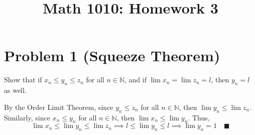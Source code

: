 \documentclass[10pt]{article}
\title{Math 1010: Homework 3}
\author{}
\date{}
\newcommand{\qed}{\quad \blacksquare}
\newcommand{\N}{\mathbb{N}}
\begin{document}
\maketitle
\vspace*{-0.5in}


\section*{Problem 1 (Squeeze Theorem)}
Show that if $x_n\leq y_n\leq z_n$ for all $n\in\mathbb{N}$, and if $\lim x_n=\lim z_n=l$, then $y_n=l$ as well.

    \color{blue}
        By the Order Limit Theorem, since $y_n \leq z_n$ for all $n \in \N$, then $\lim y_n \leq \lim z_n$. Similarly, since $x_n \leq y_n$ for all $n \in \N$, then $\lim x_n \leq \lim y_n$. Thus, \[\lim x_n \leq \lim y_n \leq \lim z_n \implies l \leq \lim y_n \leq l \implies \lim y_n = 1 \qed\] 
    \color{black}

\pagebreak
\end{document}
